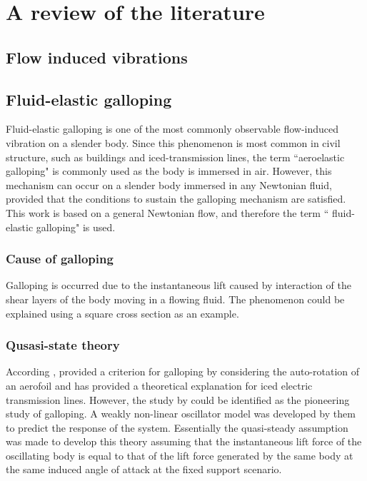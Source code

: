 \chapter{A review of the literature}

\section{Flow induced vibrations}


\section{Fluid-elastic galloping}

Fluid-elastic galloping is one of the most commonly observable flow-induced vibration on a slender body. Since this phenomenon is most common in civil structure, such as buildings and iced-transmission lines, the term ``aeroelastic galloping" is commonly used as the body is immersed in air. However, this mechanism can occur on a slender body immersed in any Newtonian fluid, provided that the conditions to sustain the galloping mechanism are satisfied. This work is based on a general Newtonian flow, and therefore the term `` fluid-elastic galloping" is used.   






\subsection{Cause of galloping}
Galloping is occurred due to the instantaneous lift caused by interaction of the shear layers of the body moving in a flowing fluid. The phenomenon could be explained using a square cross section as an example. 



\subsection{Qusasi-state theory}

According \cite{Paidoussis2010}, \cite{Glauert1919} provided a criterion for galloping by considering the auto-rotation of an aerofoil and \cite{DenHartog1956} has provided a theoretical explanation for iced electric transmission lines. However, the study by \cite{Parkinson1964} could be identified as the pioneering study of galloping. A weakly non-linear oscillator model was developed by them to predict the response of the system. Essentially the quasi-steady assumption was made to develop this theory assuming that the instantaneous lift force of the oscillating body is equal to that of the lift force generated by the same body at the same induced angle of attack at the fixed support scenario.








